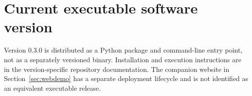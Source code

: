 \documentclass[preprint,12pt,a4paper]{elsarticle}
\newcommand{\CodeVersion}{0.3.0}
\begin{document}



\section*{Current executable software version}
Version \CodeVersion{} is distributed as a Python package and command-line
entry point, not as a separately versioned binary. Installation and execution
instructions are in the version-specific repository documentation. The
companion website in Section~\ref{sec:webdemo} has a separate deployment
lifecycle and is not identified as an equivalent executable release.
\end{document}
